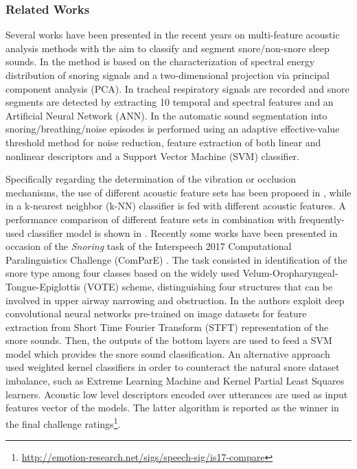 \subsubsection{Related Works}
Several works have been presented in the recent years on multi-feature acoustic analysis methods with the aim to classify and segment snore/non-snore sleep sounds.
In \cite{cavusoglu2007efficient} the method is based on the characterization of spectral energy distribution of snoring signals and a two-dimensional projection via principal component analysis (PCA). In \cite{shokrollahi2016snoring} tracheal respiratory signals are recorded and snore segments are detected by extracting 10 temporal and spectral features and an Artificial Neural Network (ANN). In \cite{wang2016automatic} the automatic sound segmentation into snoring/breathing/noise episodes is performed using an adaptive effective-value threshold method for noise reduction, feature extraction of both linear and nonlinear descriptors and a Support Vector Machine (SVM) classifier.


Specifically regarding the determination of the vibration or occlusion mechanisms, the use of different acoustic feature sets has been proposed in \cite{janott2014akustical}, while in \cite{qian2015automatic} a k-nearest neighbor (k-NN) classifier is fed with different acoustic features. A performance comparison of different feature sets in combination with frequently-used classifier model is shown in \cite{qian2016classification}. 
Recently some works have been presented in occasion of the \textit{Snoring} task of the Interspeech 2017 Computational Paralinguistics Challenge (ComParE) \cite{ComParE2017}. The task consisted in identification of the snore type among four classes based on the widely used Velum-Oropharyngeal-Tongue-Epiglottis (VOTE) scheme, distinguishing four structures that can be involved in upper airway narrowing and obstruction. In  \cite{amiriparian2017snore, freitag2017end} the authors exploit deep convolutional neural networks pre-trained on image datasets for feature extraction from Short Time Fourier Transform (STFT) representation of the snore sounds. Then, the outputs of the bottom layers are used to feed a SVM model which provides the snore sound classification.
An alternative approach used weighted kernel classifiers \cite{kaya2017introducing} in order to counteract the natural snore dataset imbalance, such as Extreme Learning Machine and Kernel Partial Least Squares learners. Acoustic low level descriptors encoded over utterances are used as input features vector of the models. The latter algorithm is reported as the winner in the final challenge ratings\footnote{\url{http://emotion-research.net/sigs/speech-sig/is17-compare}}.



